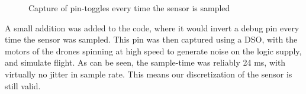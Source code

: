 \begin{figure}[H]
    \centering
    \caption{Capture of pin-toggles every time the sensor is sampled}
    \label{fig:sample_test}
\end{figure}

A small addition was added to the code, where it would invert a debug pin every time the sensor was sampled. This pin was then captured using a DSO, with the motors of the drones spinning at high speed to generate noise on the logic supply, and simulate flight. As can be seen, the sample-time was reliably 24 ms, with virtually no jitter in sample rate. This means our discretization of the sensor is still valid.

